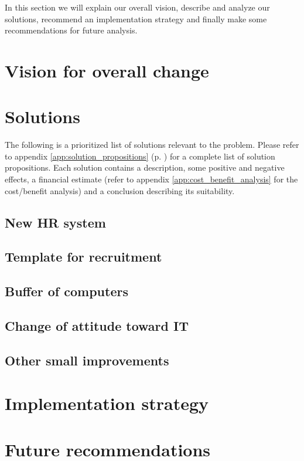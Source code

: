 In this section we will explain our overall vision, describe and analyze our solutions, recommend an implementation strategy and finally make some recommendations for future analysis.

\section{Vision for overall change}


\section{Solutions}
The following is a prioritized list of solutions relevant to the problem.
Please refer to appendix \ref{app:solution_propositions} (p. \pageref{app:solution_propositions}) for a complete list of solution propositions.
Each solution contains a description, some positive and negative effects, a financial estimate (refer to appendix \ref{app:cost_benefit_analysis} for the cost/benefit analysis) and a conclusion describing its suitability.

\subsection{New HR system}

	
\subsection{Template for recruitment}


\subsection{Buffer of computers}


\subsection{Change of attitude toward IT}


\subsection{Other small improvements}


\section{Implementation strategy}


\section{Future recommendations}
